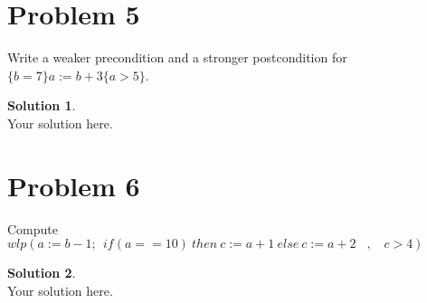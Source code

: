 \documentclass[a4paper,UTF8]{article}
\theoremstyle{definition}
\newtheorem*{solution}{Solution}
\begin{document}
\section*{Problem 5}
Write a weaker precondition and a stronger postcondition for $\{ b=7 \}a:=b+3\{ a>5 \}$.
\begin{solution}
~\\
Your solution here.
\end{solution}

\section*{Problem 6}
Compute $wlp(a:=b-1;~~if(a==10)~then~c:=a+1~else~c:=a+2~~~~,~~~~c>4 )$
\begin{solution}
~\\
Your solution here.
\end{solution}
\end{document}
